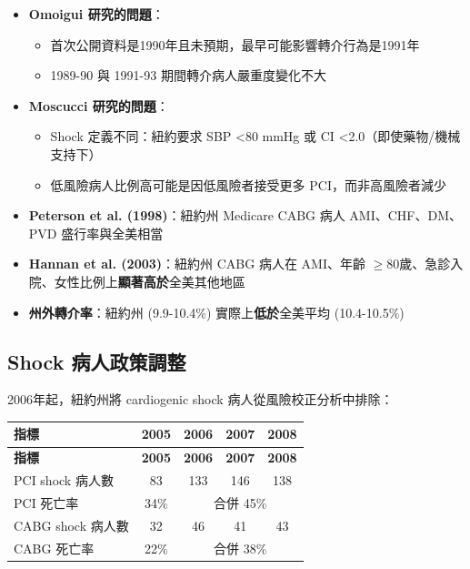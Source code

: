 \documentclass[12pt,a4paper]{article}
\begin{document}
\begin{itemize}
    \item \textbf{Omoigui 研究的問題}：
    \begin{itemize}
        \item 首次公開資料是1990年且未預期，最早可能影響轉介行為是1991年
        \item 1989-90 與 1991-93 期間轉介病人嚴重度變化不大
    \end{itemize}

    \item \textbf{Moscucci 研究的問題}：
    \begin{itemize}
        \item Shock 定義不同：紐約要求 SBP <80 mmHg 或 CI <2.0（即使藥物/機械支持下）
        \item 低風險病人比例高可能是因低風險者接受更多 PCI，而非高風險者減少
    \end{itemize}

    \item \textbf{Peterson et al. (1998)}：紐約州 Medicare CABG 病人 AMI、CHF、DM、PVD 盛行率與全美相當

    \item \textbf{Hannan et al. (2003)}：紐約州 CABG 病人在 AMI、年齡 $\geq$80歲、急診入院、女性比例上\textbf{顯著高於}全美其他地區

    \item \textbf{州外轉介率}：紐約州 (9.9-10.4\%) 實際上\textbf{低於}全美平均 (10.4-10.5\%)
\end{itemize}

\subsection{Shock 病人政策調整}

2006年起，紐約州將 cardiogenic shock 病人從風險校正分析中排除：

\begin{longtable}{p{3.5cm}cccc}
\toprule
\textbf{指標} & \textbf{2005} & \textbf{2006} & \textbf{2007} & \textbf{2008} \\
\midrule
\endfirsthead

\toprule
\textbf{指標} & \textbf{2005} & \textbf{2006} & \textbf{2007} & \textbf{2008} \\
\midrule
\endhead

\bottomrule
\endfoot

PCI shock 病人數 & 83 & 133 & 146 & 138 \\
PCI 死亡率 & 34\% & \multicolumn{3}{c}{合併 45\%} \\
\midrule
CABG shock 病人數 & 32 & 46 & 41 & 43 \\
CABG 死亡率 & 22\% & \multicolumn{3}{c}{合併 38\%} \\
\bottomrule
\end{longtable}
\end{document}

